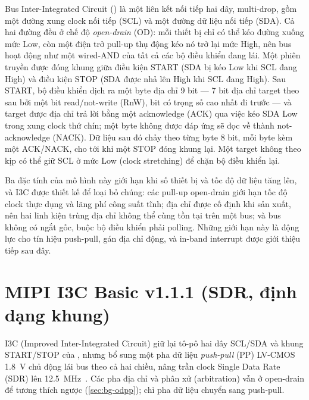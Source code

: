 Bus Inter-Integrated Circuit (\iic{}) là một liên kết nối tiếp hai dây, multi-drop, gồm một
đường xung clock nối tiếp (SCL) và một đường dữ liệu nối tiếp (SDA). Cả hai đường đều ở chế
độ \emph{open-drain} (OD): mỗi thiết bị chỉ có thể kéo đường xuống mức Low, còn một điện trở
pull-up thụ động kéo nó trở lại mức High, nên bus hoạt động như một wired-AND của tất cả các
bộ điều khiển đang lái. Một phiên truyền được đóng khung giữa điều kiện START (SDA bị kéo Low
khi SCL đang High) và điều kiện STOP (SDA được nhả lên High khi SCL đang High). Sau START, bộ
điều khiển dịch ra một byte địa chỉ 9 bit --- 7 bit địa chỉ target theo sau bởi một bit
read/not-write (RnW), bit có trọng số cao nhất đi trước --- và target được địa chỉ trả lời
bằng một acknowledge (ACK) qua việc kéo SDA Low trong xung clock thứ chín; một byte không được
đáp ứng sẽ đọc về thành not-acknowledge (NACK). Dữ liệu sau đó chảy theo từng byte 8 bit, mỗi
byte kèm một ACK/NACK, cho tới khi một STOP đóng khung lại. Một target không theo kịp có thể
giữ SCL ở mức Low (clock stretching) để chặn bộ điều khiển lại.

Ba đặc tính của mô hình này giới hạn \iic{} khi số thiết bị và tốc độ dữ liệu tăng lên, và
I3C được thiết kế để loại bỏ chúng: các pull-up open-drain giới hạn tốc độ clock thực dụng và
lãng phí công suất tĩnh; địa chỉ được cố định khi sản xuất, nên hai linh kiện trùng địa chỉ
không thể cùng tồn tại trên một bus; và bus không có ngắt gốc, buộc bộ điều khiển phải polling.
Những giới hạn này là động lực cho tín hiệu push-pull, gán địa chỉ động, và in-band interrupt
được giới thiệu tiếp sau đây.

\section{MIPI I3C Basic v1.1.1 (SDR, định dạng khung)}
\label{sec:bg-i3c-sdr}

I3C (Improved Inter-Integrated Circuit) giữ lại tô-pô hai dây SCL/SDA và khung START/STOP của
\iic{}, nhưng bổ sung một pha dữ liệu \emph{push-pull} (PP) LV-CMOS \SI{1.8}{\volt} chủ động
lái bus theo cả hai chiều, nâng trần clock Single Data Rate (SDR) lên
\SI{12.5}{\mega\hertz}~\cite{mipi_i3c_basic}. Các pha địa chỉ và phân xử (arbitration) vẫn ở
open-drain để tương thích ngược (\cref{sec:bg-odpp}); chỉ pha dữ liệu chuyển sang push-pull.

